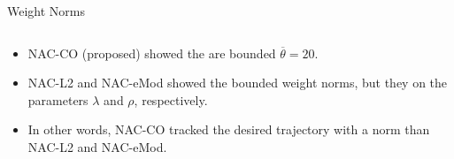 \documentclass[8pt, aspectratio=169]{beamer}
\newcommand{\ctxt}[2]{\color{#1}{#2}\color{black} }
\begin{document}
\begin{frame}{\insertsubsectionhead}{Weight Norms}
\begin{columns}
  \end{columns}

  \begin{itemize}
    \item<+-> NAC-CO (proposed) showed the \ctxt{airforceblue}{weight norms } are bounded \ctxt{awesome}{under pre-defined constraint } $\overline{\theta}=20$.
    \item<+-> NAC-L2 and NAC-eMod showed the bounded weight norms, but they \ctxt{awesome}{depended } on the parameters $\lambda$ and $\rho$, respectively.
    \item<+-> In other words, NAC-CO tracked the desired trajectory with a \ctxt{airforceblue}{smaller weight } norm than NAC-L2 and NAC-eMod.
  \end{itemize}

\end{frame}
\end{document}
